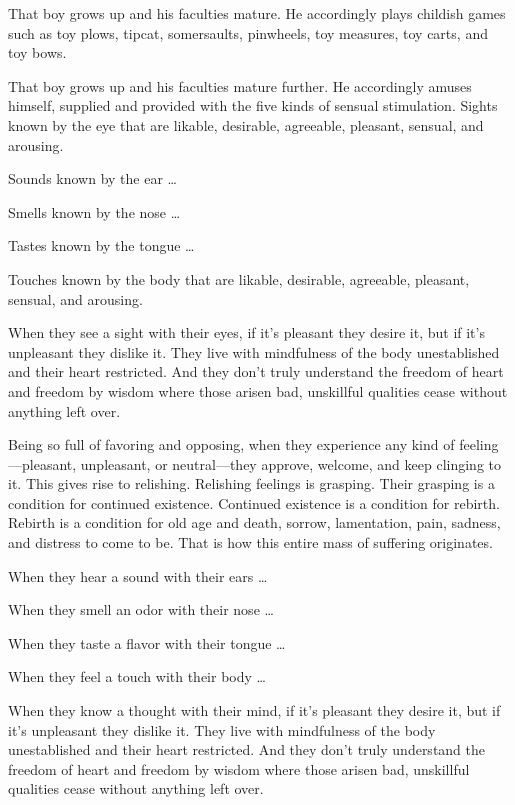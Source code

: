 \documentclass[12pt,openany]{book}%
\begin{document}
That boy grows up and his faculties mature. He accordingly plays childish games such as toy plows, tipcat, somersaults, pinwheels, toy measures, toy carts, and toy bows. 

That boy grows up and his faculties mature further. He accordingly amuses himself, supplied and provided with the five kinds of sensual stimulation. Sights known by the eye that are likable, desirable, agreeable, pleasant, sensual, and arousing. 

Sounds known by the ear … 

Smells known by the nose … 

Tastes known by the tongue … 

Touches known by the body that are likable, desirable, agreeable, pleasant, sensual, and arousing. 

When they see a sight with their eyes, if it’s pleasant they desire it, but if it’s unpleasant they dislike it. They live with mindfulness of the body unestablished and their heart restricted. And they don’t truly understand the freedom of heart and freedom by wisdom where those arisen bad, unskillful qualities cease without anything left over. 

Being so full of favoring and opposing, when they experience any kind of feeling—pleasant, unpleasant, or neutral—they approve, welcome, and keep clinging to it. This gives rise to relishing. Relishing feelings is grasping. Their grasping is a condition for continued existence. Continued existence is a condition for rebirth. Rebirth is a condition for old age and death, sorrow, lamentation, pain, sadness, and distress to come to be. That is how this entire mass of suffering originates. 

When they hear a sound with their ears … 

When they smell an odor with their nose … 

When they taste a flavor with their tongue … 

When they feel a touch with their body … 

When they know a thought with their mind, if it’s pleasant they desire it, but if it’s unpleasant they dislike it. They live with mindfulness of the body unestablished and their heart restricted. And they don’t truly understand the freedom of heart and freedom by wisdom where those arisen bad, unskillful qualities cease without anything left over. 
\end{document}
